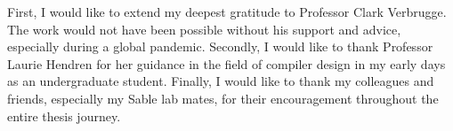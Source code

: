 First, I would like to extend my deepest gratitude to Professor Clark Verbrugge.
The work would not have been possible without his support and advice, especially
during a global pandemic. Secondly, I would like to thank Professor
Laurie Hendren for her guidance in the field of compiler design in my early days
as an undergraduate student. Finally, I would like to thank my colleagues and
friends, especially my Sable lab mates, for their encouragement throughout the
entire thesis journey.
